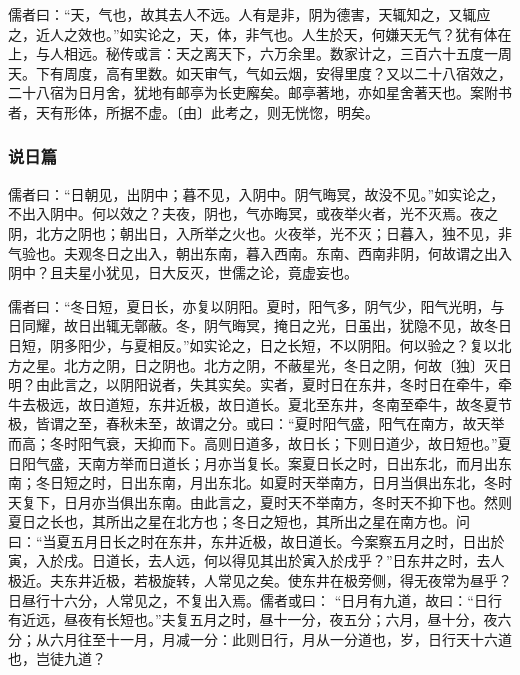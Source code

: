 \documentclass[]{article}
\begin{document}
儒者曰：``天，气也，故其去人不远。人有是非，阴为德害，天辄知之，又辄应之，近人之效也。''如实论之，天，体，非气也。人生於天，何嫌天无气？犹有体在上，与人相远。秘传或言：天之离天下，六万余里。数家计之，三百六十五度一周天。下有周度，高有里数。如天审气，气如云烟，安得里度？又以二十八宿效之，二十八宿为日月舍，犹地有邮亭为长吏廨矣。邮亭著地，亦如星舍著天也。案附书者，天有形体，所据不虚。〔由〕此考之，则无恍惚，明矣。

\hypertarget{header-n488}{%
\subsubsection{说日篇}\label{header-n488}}

儒者曰：``日朝见，出阴中；暮不见，入阴中。阴气晦冥，故没不见。''如实论之，不出入阴中。何以效之？夫夜，阴也，气亦晦冥，或夜举火者，光不灭焉。夜之阴，北方之阴也；朝出日，入所举之火也。火夜举，光不灭；日暮入，独不见，非气验也。夫观冬日之出入，朝出东南，暮入西南。东南、西南非阴，何故谓之出入阴中？且夫星小犹见，日大反灭，世儒之论，竟虚妄也。

儒者曰：``冬日短，夏日长，亦复以阴阳。夏时，阳气多，阴气少，阳气光明，与日同耀，故日出辄无鄣蔽。冬，阴气晦冥，掩日之光，日虽出，犹隐不见，故冬日日短，阴多阳少，与夏相反。''如实论之，日之长短，不以阴阳。何以验之？复以北方之星。北方之阴，日之阴也。北方之阴，不蔽星光，冬日之阴，何故〔独〕灭日明？由此言之，以阴阳说者，失其实矣。实者，夏时日在东井，冬时日在牵牛，牵牛去极远，故日道短，东井近极，故日道长。夏北至东井，冬南至牵牛，故冬夏节极，皆谓之至，春秋未至，故谓之分。或曰：``夏时阳气盛，阳气在南方，故天举而高；冬时阳气衰，天抑而下。高则日道多，故日长；下则日道少，故日短也。''夏日阳气盛，天南方举而日道长；月亦当复长。案夏日长之时，日出东北，而月出东南；冬日短之时，日出东南，月出东北。如夏时天举南方，日月当俱出东北，冬时天复下，日月亦当俱出东南。由此言之，夏时天不举南方，冬时天不抑下也。然则夏日之长也，其所出之星在北方也；冬日之短也，其所出之星在南方也。问曰：``当夏五月日长之时在东井，东井近极，故日道长。今案察五月之时，日出於寅，入於戌。日道长，去人远，何以得见其出於寅入於戌乎？''日东井之时，去人极近。夫东井近极，若极旋转，人常见之矣。使东井在极旁侧，得无夜常为昼乎？日昼行十六分，人常见之，不复出入焉。儒者或曰：
``日月有九道，故曰：``日行有近远，昼夜有长短也。''夫复五月之时，昼十一分，夜五分；六月，昼十分，夜六分；从六月往至十一月，月减一分：此则日行，月从一分道也，岁，日行天十六道也，岂徒九道？
\end{document}
